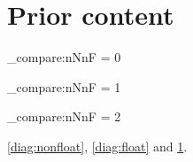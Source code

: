 \documentclass{article}
\begin{document}
\section{Prior content}\label{sec:prior}
\ExplSyntaxOn
\int_compare:nNnF {\value{figure}} = {0}
  {\PackageError{pxDIAG-reference}{Unlabelled diagram changed counters}{}}
\ExplSyntaxOff
{}
\ExplSyntaxOn
\int_compare:nNnF {\value{figure}} = {1}
  {\PackageError{pxDIAG-reference}{Nonfloating label did not number figure}{}}
\ExplSyntaxOff
{}
\ExplSyntaxOn
\int_compare:nNnF {\value{figure}} = {2}
  {\PackageError{pxDIAG-reference}{Floating figure numbering changed}{}}
\ExplSyntaxOff
\ref{diag:nonfloat}, \ref{diag:float} and \ref{sec:prior}.
\listoffigures
\end{document}
